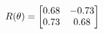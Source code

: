 \documentclass[preview]{standalone}
\begin{document}
\begin{align*}
\special{dvisvgm:raw <g id='unique000'>}R(\theta) = \begin{bmatrix}0.68 & -0.73\\0.73 & 0.68\end{bmatrix}\special{dvisvgm:raw </g>}
\end{align*}
\end{document}
